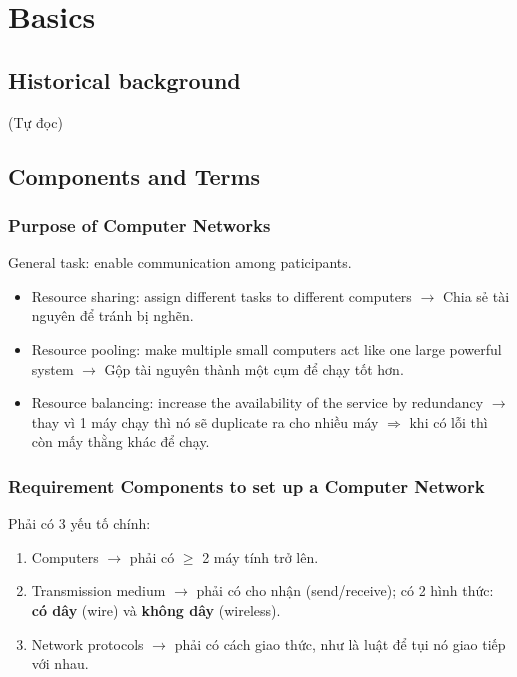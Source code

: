 \chapter{Basics}

\section{Historical background}
(Tự đọc)

\section{Components and Terms}

\subsection{Purpose of Computer Networks}

\noindent
General task: enable communication among paticipants.

\begin{itemize}
    \item Resource sharing: assign different tasks to different computers $\rightarrow$ Chia sẻ tài nguyên để tránh bị nghẽn.
    \item Resource pooling: make multiple small computers act like one large powerful system $\rightarrow$ Gộp tài nguyên thành một cụm để chạy tốt hơn.
    \item Resource balancing: increase the availability of the service by redundancy $\rightarrow$ thay vì 1 máy chạy thì nó sẽ duplicate ra cho nhiều máy $\Rightarrow$ khi có lỗi thì còn mấy thằng khác để chạy.
\end{itemize}
\medskip

\subsection{Requirement Components to set up a Computer Network}

\noindent
Phải có 3 yếu tố chính:

\begin{enumerate}
    \item Computers $\rightarrow$ phải có $\geq$ 2 máy tính trở lên.
    \item Transmission medium $\rightarrow$ phải có cho nhận (send/receive); có 2 hình thức: \textbf{có dây} (wire) và \textbf{không dây} (wireless).
    \item Network protocols $\rightarrow$ phải có cách giao thức, như là luật để tụi nó giao tiếp với nhau.
\end{enumerate}

